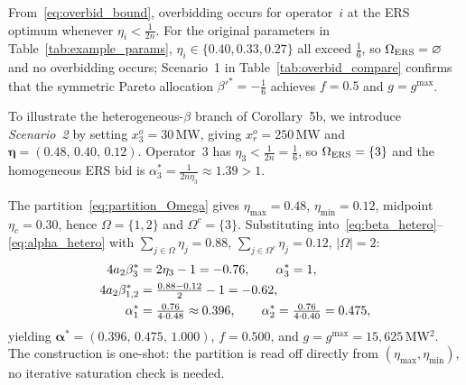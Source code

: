 \documentclass[conference]{IEEEtran}
\begin{document}
From~\eqref{eq:overbid_bound}, overbidding occurs for operator~$i$ at the ERS optimum whenever $\eta_i < \frac{1}{2n}$. For the original parameters in Table~\ref{tab:example_params}, $\eta_i \in \{0.40, 0.33, 0.27\}$ all exceed $\frac{1}{6}$, so $\Omega_{\rm ERS}=\varnothing$ and no overbidding occurs; Scenario~1 in Table~\ref{tab:overbid_compare} confirms that the symmetric Pareto allocation $\beta'^* = -\frac{1}{6}$ achieves $f=0.5$ and $g=g^{\max}$.

To illustrate the heterogeneous-$\beta$ branch of Corollary~5b, we introduce \textit{Scenario~2} by setting $x_3^o = 30$\,MW, giving $x_r^o = 250$\,MW and $\boldsymbol{\eta}=(0.48,\,0.40,\,0.12)$. Operator~3 has $\eta_3 < \tfrac{1}{2n}=\tfrac{1}{6}$, so $\Omega_{\rm ERS}=\{3\}$ and the homogeneous ERS bid is $\alpha_3^*=\tfrac{1}{2n\eta_3}\approx1.39>1$.

The partition~\eqref{eq:partition_Omega} gives $\eta_{\max}=0.48$, $\eta_{\min}=0.12$, midpoint $\eta_c=0.30$, hence $\Omega=\{1,2\}$ and $\Omega^c=\{3\}$. Substituting into~\eqref{eq:beta_hetero}--\eqref{eq:alpha_hetero} with $\sum_{j\in\Omega}\eta_j=0.88$, $\sum_{j\in\Omega^c}\eta_j=0.12$, $|\Omega|=2$:
\begin{align}
  4a_2\beta_3^* &= 2\eta_3-1 = -0.76,\qquad \alpha_3^*=1,\notag\\
  4a_2\beta_{1,2}^* &= \tfrac{0.88-0.12}{2}-1 = -0.62, \notag\\
  \alpha_1^* &= \tfrac{0.76}{4\cdot 0.48}\approx 0.396, \qquad
  \alpha_2^* = \tfrac{0.76}{4\cdot 0.40}=0.475, \notag
\end{align}
yielding $\boldsymbol{\alpha}^*=(0.396,\,0.475,\,1.000)$, $f=0.500$, and $g=g^{\max}=15{,}625$\,MW$^2$. The construction is one-shot: the partition is read off directly from $(\eta_{\max},\eta_{\min})$, no iterative saturation check is needed.
\end{document}
